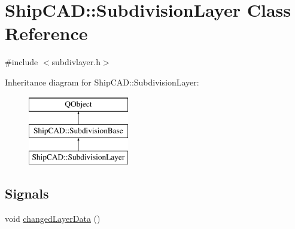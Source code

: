 \hypertarget{classShipCAD_1_1SubdivisionLayer}{\section{Ship\-C\-A\-D\-:\-:Subdivision\-Layer Class Reference}
\label{classShipCAD_1_1SubdivisionLayer}
}


{\ttfamily \#include $<$subdivlayer.\-h$>$}

Inheritance diagram for Ship\-C\-A\-D\-:\-:Subdivision\-Layer\-:\begin{figure}[H]
\begin{center}
\leavevmode
\includegraphics[height=3.000000cm]{classShipCAD_1_1SubdivisionLayer}
\end{center}
\end{figure}
\subsection*{Signals}
\begin{DoxyCompactItemize}
\item 
void \hyperlink{classShipCAD_1_1SubdivisionLayer_aaa4d81b88e39ed9ef93d4df562d11433}{changed\-Layer\-Data} ()
\end{DoxyCompactItemize}
